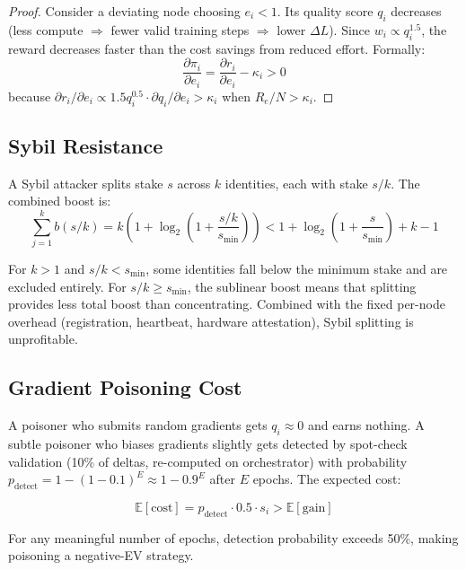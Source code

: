 \documentclass[11pt,letterpaper]{article}
\begin{document}
\begin{proof}
Consider a deviating node choosing $e_i < 1$.  Its quality score $q_i$ decreases (less compute $\Rightarrow$ fewer valid training steps $\Rightarrow$ lower $\Delta L$).  Since $w_i \propto q_i^{1.5}$, the reward decreases faster than the cost savings from reduced effort.  Formally:
\[
\frac{\partial \pi_i}{\partial e_i} = \frac{\partial r_i}{\partial e_i} - \kappa_i > 0
\]
because $\partial r_i / \partial e_i \propto 1.5 q_i^{0.5} \cdot \partial q_i / \partial e_i > \kappa_i$ when $R_e / N > \kappa_i$.
\end{proof}

\subsection{Sybil Resistance}

A Sybil attacker splits stake $s$ across $k$ identities, each with stake $s/k$.  The combined boost is:
\begin{equation}
    \sum_{j=1}^k b(s/k) = k\!\left(1 + \log_2\!\left(1 + \frac{s/k}{s_{\min}}\right)\right) < 1 + \log_2\!\left(1 + \frac{s}{s_{\min}}\right) + k - 1
\end{equation}

For $k > 1$ and $s/k < s_{\min}$, some identities fall below the minimum stake and are excluded entirely.  For $s/k \geq s_{\min}$, the sublinear boost means that splitting provides less total boost than concentrating.  Combined with the fixed per-node overhead (registration, heartbeat, hardware attestation), Sybil splitting is unprofitable.

\subsection{Gradient Poisoning Cost}

A poisoner who submits random gradients gets $q_i \approx 0$ and earns nothing.  A subtle poisoner who biases gradients slightly gets detected by spot-check validation (10\% of deltas, re-computed on orchestrator) with probability $p_{\text{detect}} = 1 - (1 - 0.1)^E \approx 1 - 0.9^E$ after $E$ epochs.  The expected cost:

\begin{equation}
    \mathbb{E}[\text{cost}] = p_{\text{detect}} \cdot 0.5 \cdot s_i > \mathbb{E}[\text{gain}]
\end{equation}

For any meaningful number of epochs, detection probability exceeds 50\%, making poisoning a negative-EV strategy.
\end{document}
